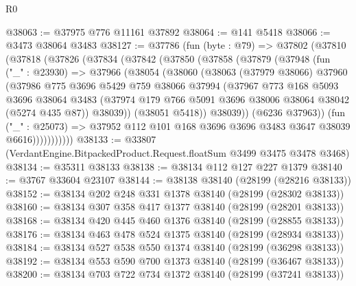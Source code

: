 \begin{lexlean}{R0}
\begin{coremodule}
@38063 := @37975 @776 @11161 @37892
@38064 := @141 @5418
@38066 := @3473 @38064 @3483
@38127 := @37786
    (fun (byte : @79) =>
    @37802
      (@37810
        (@37818
          (@37826
            (@37834
              (@37842
                (@37850
                  (@37858
                    (@37879
                      (@37948
                        (fun ("_" : @23930) =>
                        @37966
                          (@38054
                            (@38060
                              (@38063
                                (@37979 @38066)
                                @37960
                                (@37986
                                  @775
                                  @3696
                                  @5429
                                  @759
                                  @38066
                                  @37994
                                  (@37967
                                    @773
                                    @168
                                    @5093
                                    @3696
                                    @38064
                                    @3483
                                    (@37974
                                      @179
                                      @766
                                      @5091
                                      @3696
                                      @38006
                                      @38064
                                      @38042
                                      (@5274 @435 @87))
                                    @38039))
                                (@38051 @5418))
                              @38039))
                          (@6236 @37963))
                        (fun ("_" : @25073) =>
                        @37952 @112 @101 @168 @3696 @3696 @3483 @3647 @38039 @6616)))))))))))
@38133 := @33807 (VerdantEngine.BitpackedProduct.Request.floatSum @3499 @3475 @3478 @3468)
@38134 := @35311 @38133
@38138 := @38134 @112 @127 @227 @1379
@38140 := @3767 @33604 @23107
@38144 := @38138 @38140 (@28199 (@28216 @38133))
@38152 := @38134 @202 @248 @331 @1378 @38140 (@28199 (@28302 @38133))
@38160 := @38134 @307 @358 @417 @1377 @38140 (@28199 (@28201 @38133))
@38168 := @38134 @420 @445 @460 @1376 @38140 (@28199 (@28855 @38133))
@38176 := @38134 @463 @478 @524 @1375 @38140 (@28199 (@28934 @38133))
@38184 := @38134 @527 @538 @550 @1374 @38140 (@28199 (@36298 @38133))
@38192 := @38134 @553 @590 @700 @1373 @38140 (@28199 (@36467 @38133))
@38200 := @38134 @703 @722 @734 @1372 @38140 (@28199 (@37241 @38133))

\end{coremodule}
\end{lexlean}
